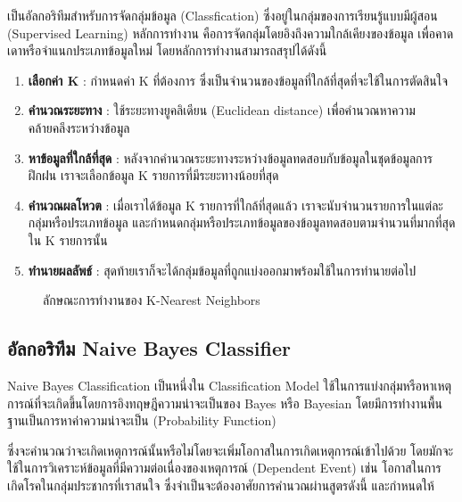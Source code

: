 เป็นอัลกอริทึมสำหรับการจัดกลุ่มข้อมูล (Classfication) ซึ่งอยู่ในกลุ่มของการเรียนรู้แบบมีผู้สอน (Supervised Learning)
หลักการทำงาน คือการจัดกลุ่มโดยอิงถึงความใกล้เคียงของข้อมูล เพื่อคาดเดาหรือจำแนกประเภทข้อมูลใหม่ \cite{kNeighbor} โดยหลักการทำงานสามารถสรุปได้ดังนี้
\begin{enumerate}
      \item  \textbf{เลือกค่า K} : กำหนดค่า K ที่ต้องการ ซึ่งเป็นจำนวนของข้อมูลที่ใกล้ที่สุดที่จะใช้ในการตัดสินใจ
      \item  \textbf{คำนวณระยะทาง} : ใช้ระยะทางยูคลิเดียน (Euclidean distance) เพื่อคำนวณหาความคล้ายคลึงระหว่างข้อมูล
      \item  \textbf{หาข้อมูลที่ใกล้ที่สุด} : หลังจากคำนวณระยะทางระหว่างข้อมูลทดสอบกับข้อมูลในชุดข้อมูลการฝึกฝน เราจะเลือกข้อมูล K รายการที่มีระยะทางน้อยที่สุด
      \item  \textbf{คำนวณผลโหวต} : เมื่อเราได้ข้อมูล K รายการที่ใกล้ที่สุดแล้ว เราจะนับจำนวนรายการในแต่ละกลุ่มหรือประเภทข้อมูล
            และกำหนดกลุ่มหรือประเภทข้อมูลของข้อมูลทดสอบตามจำนวนที่มากที่สุดใน K รายการนั้น
      \item  \textbf{ทำนายผลลัพธ์} : สุดท้ายเราก็จะได้กลุ่มข้อมูลที่ถูกแบ่งออกมาพร้อมใช้ในการทำนายต่อไป
\end{enumerate}

\begin{figure}[!h]\centering
      \setlength{\fboxrule}{0.2mm} %
      \setlength{\fboxsep}{1cm}
      \caption{ลักษณะการทำงานของ K-Nearest Neighbors}\label{fig:model2}
\end{figure}

\subsection{อัลกอริทึม Naive Bayes Classifier}
Naive Bayes Classification เป็นหนึ่งใน Classification Model ใช้ในการแบ่งกลุ่มหรือหาเหตุการณ์ที่จะเกิดขึ้นโดยการอิงทฤษฎีความน่าจะเป็นของ
Bayes หรือ Bayesian โดยมีการทำงานพื้นฐานเป็นการหาค่าความน่าจะเป็น (Probability Function)
\par ซึ่งจะคำนวณว่าจะเกิดเหตุการณ์นั้นหรือไม่โดยจะเพิ่มโอกาสในการเกิดเหตุการณ์เข้าไปด้วย
โดยมักจะใช้ในการวิเคราะห์ข้อมูลที่มีความต่อเนื่องของเหตุการณ์ (Dependent Event) เช่น
โอกาสในการเกิดโรคในกลุ่มประชากรที่เราสนใจ \cite{naiveBayes-1,naiveBayes-2} ซึ่งจำเป็นจะต้องอาศัยการคำนวณผ่านสูตรดังนี้ และกำหนดให้


